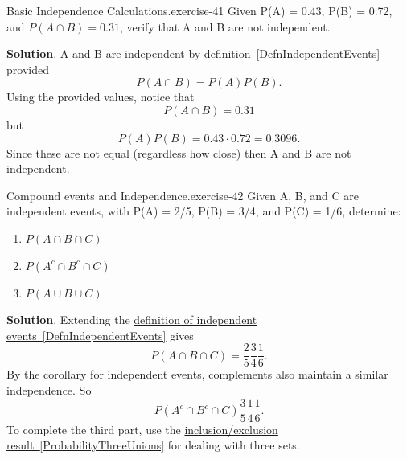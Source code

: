 \documentclass[10pt,]{book}
\numberwithin{equation}{section}
\begin{document}
%
\par
\hypertarget{p-631}{}%
\begin{inlineexercise}{Basic Independence Calculations.}{exercise-41}%
\hypertarget{p-632}{}%
Given P(A) = 0.43, P(B) = 0.72, and \(P(A \cap B) = 0.31\), verify that A and B are not independent.%
\par\smallskip%
\noindent\textbf{Solution}.\hypertarget{solution-18}{}\quad%
\hypertarget{p-633}{}%
A and B are \hyperref[DefnIndependentEvents]{independent by definition~\ref{DefnIndependentEvents}} provided%
\begin{equation*}
P(A \cap B) = P(A) P(B).
\end{equation*}
Using the provided values, notice that%
\begin{equation*}
P(A \cap B) = 0.31
\end{equation*}
but%
\begin{equation*}
P(A)P(B) = 0.43 \cdot 0.72 = 0.3096.
\end{equation*}
Since these are not equal (regardless how close) then A and B are not independent.%
\end{inlineexercise}
%
\par
\hypertarget{p-634}{}%
\begin{inlineexercise}{Compound events and Independence.}{exercise-42}%
\hypertarget{p-635}{}%
Given A, B, and C are independent events, with P(A) = 2/5, P(B) = 3/4, and P(C) = 1/6, determine: \leavevmode%
\begin{enumerate}
\item\hypertarget{li-182}{}\(P(A \cap B \cap C)\)%
\item\hypertarget{li-183}{}\(P(A^c \cap B^c \cap C)\)%
\item\hypertarget{li-184}{}\(P(A \cup B \cup C)\)%
\end{enumerate}
%
\par\smallskip%
\noindent\textbf{Solution}.\hypertarget{solution-19}{}\quad%
\hypertarget{p-636}{}%
Extending the \hyperref[DefnIndependentEvents]{definition of independent events~\ref{DefnIndependentEvents}} gives%
\begin{equation*}
P(A \cap B \cap C) = \frac{2}{5} \frac{3}{4} \frac{1}{6}.
\end{equation*}
By the corollary for independent events, complements also maintain a similar independence. So%
\begin{equation*}
P(A^c \cap B^c \cap C) \frac{3}{5} \frac{1}{4} \frac{1}{6} .
\end{equation*}
To complete the third part, use the \hyperref[ProbabilityThreeUnions]{inclusion/exclusion result~\ref{ProbabilityThreeUnions}} for dealing with three sets.%
\end{inlineexercise}
\end{document}
